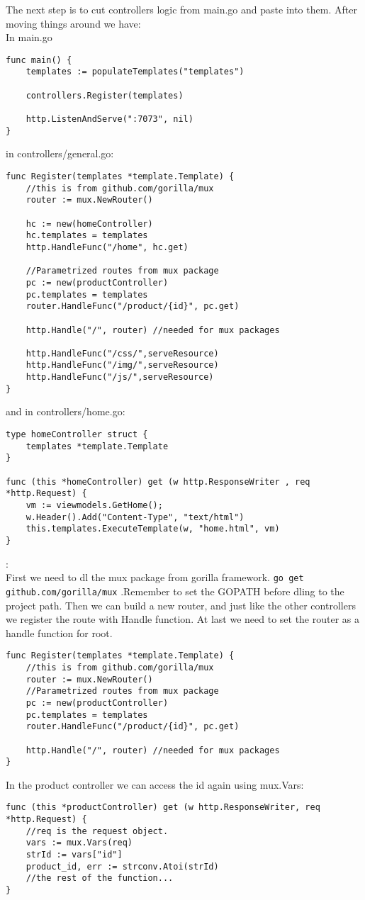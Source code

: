 The next step is to cut controllers logic from main.go and paste into them. After moving things around we have:\\In main.go
\begin{lstlisting}[language=Golang]
func main() {
	templates := populateTemplates("templates")

	controllers.Register(templates)

	http.ListenAndServe(":7073", nil)
}
\end{lstlisting}
in controllers/general.go:
\begin{lstlisting}[language=Golang]
func Register(templates *template.Template) {
	//this is from github.com/gorilla/mux
	router := mux.NewRouter()

	hc := new(homeController)
	hc.templates = templates
	http.HandleFunc("/home", hc.get)

	//Parametrized routes from mux package
	pc := new(productController)
	pc.templates = templates
	router.HandleFunc("/product/{id}", pc.get)

	http.Handle("/", router) //needed for mux packages

	http.HandleFunc("/css/",serveResource)
	http.HandleFunc("/img/",serveResource)
	http.HandleFunc("/js/",serveResource)
}
\end{lstlisting}
and in controllers/home.go:
\begin{lstlisting}[language=Golang]
type homeController struct {
	templates *template.Template
}

func (this *homeController) get (w http.ResponseWriter , req *http.Request) {
	vm := viewmodels.GetHome();
	w.Header().Add("Content-Type", "text/html")
	this.templates.ExecuteTemplate(w, "home.html", vm)
}
\end{lstlisting}
\begin{note}:\\
First we need to dl the mux package from gorilla framework.
\verb|go get github.com/gorilla/mux| .Remember to set the GOPATH before dling to the project path. Then we can build a new router, and just like the other controllers we register the route with Handle function. At last we need to set the router as a handle function for root.
\begin{lstlisting}[language=Golang]
func Register(templates *template.Template) {
	//this is from github.com/gorilla/mux
	router := mux.NewRouter()
	//Parametrized routes from mux package
	pc := new(productController)
	pc.templates = templates
	router.HandleFunc("/product/{id}", pc.get)

	http.Handle("/", router) //needed for mux packages
}
\end{lstlisting}
In the product controller we can access the id again using mux.Vars:
\begin{lstlisting}[language=Golang]
func (this *productController) get (w http.ResponseWriter, req *http.Request) {
	//req is the request object.
	vars := mux.Vars(req)
	strId := vars["id"]
	product_id, err := strconv.Atoi(strId)
	//the rest of the function...
}
\end{lstlisting}
\end{note}
